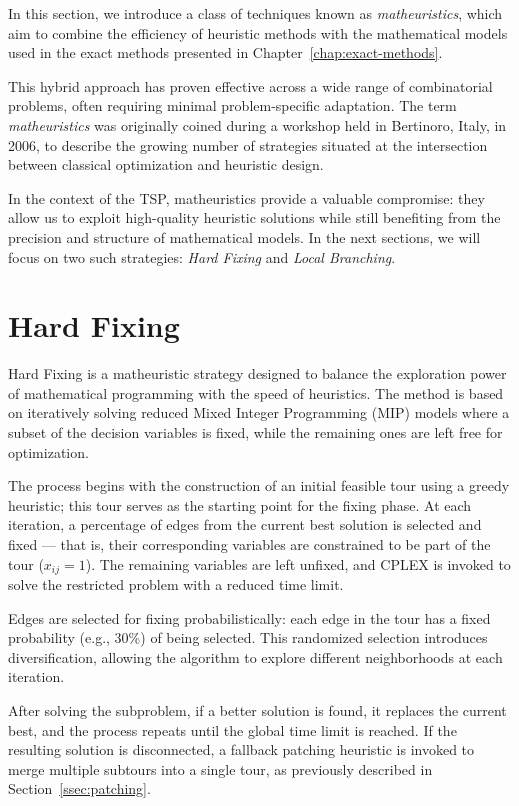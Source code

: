 In this section, we introduce a class of techniques known as \emph{matheuristics}, which aim to combine the efficiency of heuristic methods with the mathematical models used in the exact methods presented in Chapter~\ref{chap:exact-methods}.

This hybrid approach has proven effective across a wide range of combinatorial problems, often requiring minimal problem-specific adaptation. The term \emph{matheuristics} was originally coined during a workshop held in Bertinoro, Italy, in 2006, to describe the growing number of strategies situated at the intersection between classical optimization and heuristic design.

In the context of the TSP, matheuristics provide a valuable compromise: they allow us to exploit high-quality heuristic solutions while still benefiting from the precision and structure of mathematical models. In the next sections, we will focus on two such strategies: \emph{Hard Fixing} and \emph{Local Branching}.

\section{Hard Fixing}

Hard Fixing is a matheuristic strategy designed to balance the exploration power of mathematical programming with the speed of heuristics. The method is based on iteratively solving reduced Mixed Integer Programming (MIP) models where a subset of the decision variables is fixed, while the remaining ones are left free for optimization.

The process begins with the construction of an initial feasible tour using a greedy heuristic; this tour serves as the starting point for the fixing phase. At each iteration, a percentage of edges from the current best solution is selected and fixed — that is, their corresponding variables are constrained to be part of the tour (\( x_{ij} = 1 \)). The remaining variables are left unfixed, and CPLEX is invoked to solve the restricted problem with a reduced time limit.

Edges are selected for fixing probabilistically: each edge in the tour has a fixed probability (e.g., 30\%) of being selected. This randomized selection introduces diversification, allowing the algorithm to explore different neighborhoods at each iteration.

After solving the subproblem, if a better solution is found, it replaces the current best, and the process repeats until the global time limit is reached. If the resulting solution is disconnected, a fallback patching heuristic is invoked to merge multiple subtours into a single tour, as previously described in Section~\ref{ssec:patching}.

